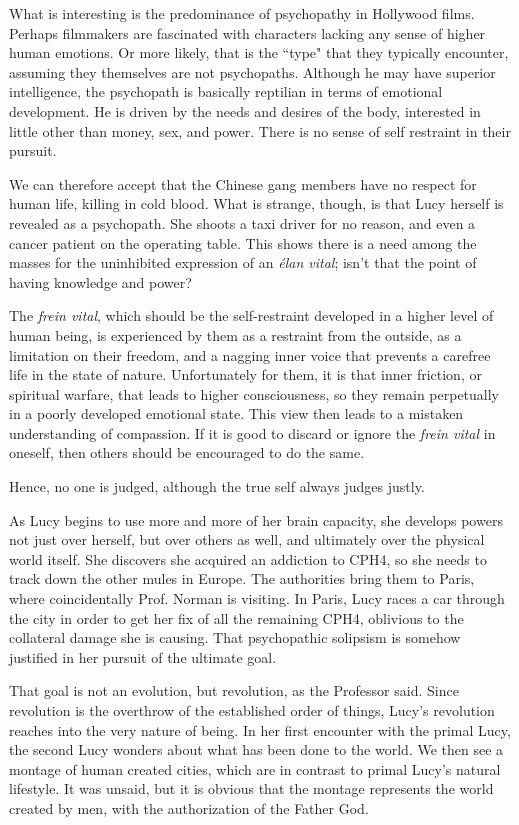 What is interesting is the predominance of psychopathy in Hollywood films. Perhaps filmmakers are fascinated with characters lacking any sense of higher human emotions. Or more likely, that is the ``type" that they typically encounter, assuming they themselves are not psychopaths. Although he may have superior intelligence, the psychopath is basically reptilian in terms of emotional development. He is driven by the needs and desires of the body, interested in little other than money, sex, and power. There is no sense of self restraint in their pursuit.

We can therefore accept that the Chinese gang members have no respect for human life, killing in cold blood. What is strange, though, is that Lucy herself is revealed as a psychopath. She shoots a taxi driver for no reason, and even a cancer patient on the operating table. This shows there is a need among the masses for the uninhibited expression of an \emph{élan vital}; isn't that the point of having knowledge and power?

The \emph{frein vital}, which should be the self-restraint developed in a higher level of human being, is experienced by them as a restraint from the outside, as a limitation on their freedom, and a nagging inner voice that prevents a carefree life in the state of nature. Unfortunately for them, it is that inner friction, or spiritual warfare, that leads to higher consciousness, so they remain perpetually in a poorly developed emotional state. This view then leads to a mistaken understanding of compassion. If it is good to discard or ignore the \emph{frein vital} in oneself, then others should be encouraged to do the same.

Hence, no one is judged, although the true self always judges justly.

As Lucy begins to use more and more of her brain capacity, she develops powers not just over herself, but over others as well, and ultimately over the physical world itself. She discovers she acquired an addiction to CPH4, so she needs to track down the other mules in Europe. The authorities bring them to Paris, where coincidentally Prof. Norman is visiting. In Paris, Lucy races a car through the city in order to get her fix of all the remaining CPH4, oblivious to the collateral damage she is causing. That psychopathic solipsism is somehow justified in her pursuit of the ultimate goal.

That goal is not an evolution, but revolution, as the Professor said. Since revolution is the overthrow of the established order of things, Lucy's revolution reaches into the very nature of being. In her first encounter with the primal Lucy, the second Lucy wonders about what has been done to the world. We then see a montage of human created cities, which are in contrast to primal Lucy's natural lifestyle. It was unsaid, but it is obvious that the montage represents the world created by men, with the authorization of the Father God.

